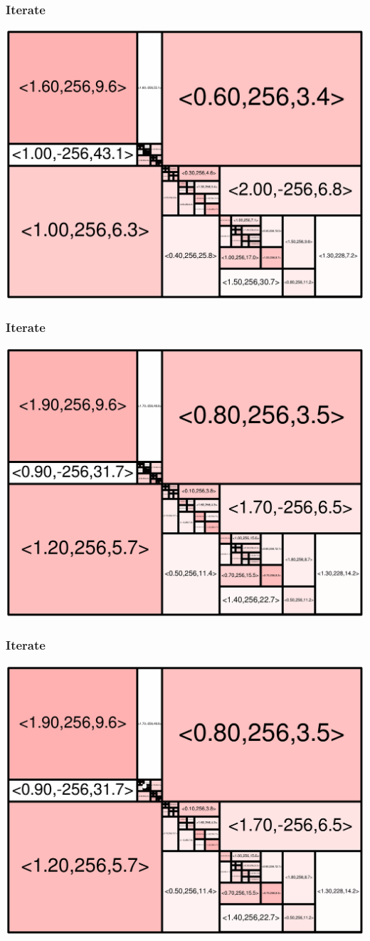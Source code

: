 \begin{frame}
\frametitle{Iterate}\begin{centering}\includegraphics[width=8.5 cm]{remy-graph/graph/test78.pdf}

\end{centering}\end{frame}


\begin{frame}
\frametitle{Iterate}\begin{centering}\includegraphics[width=8.5 cm]{remy-graph/graph/test79.pdf}

\end{centering}\end{frame}


\begin{frame}
\frametitle{Iterate}\begin{centering}\includegraphics[width=8.5 cm]{remy-graph/graph/test80.pdf}

\end{centering}\end{frame}


